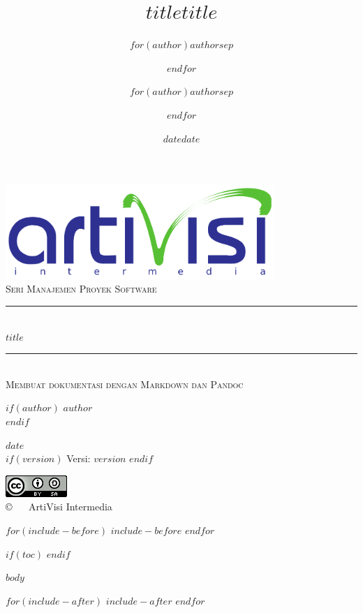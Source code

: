 \documentclass[a4,11pt]{$documentclass$}
\title{$title$}
\author{$for(author)$$author$$sep$ \and $endfor$}
\date{$date$}
\title{$title$}
\author{$for(author)$$author$$sep$ \and $endfor$}
\date{$date$}
\newcommand{\HRule}{\rule{\linewidth}{0.5mm}}
\begin{document}
\begin{titlepage}


    \begin{center}


        \includegraphics[width=4in]{./logo}\\[3cm]    

        \textsc{\LARGE Seri Manajemen Proyek Software}\\[0.5cm]

        \HRule \\[0.4cm]
        { \huge \bfseries $title$}\\[0.4cm]

        \HRule \\[0.5cm]

        \textsc{\Large Membuat dokumentasi dengan Markdown dan Pandoc}\\[2cm]

        \begin{minipage}{0.8\textwidth}
            \begin{flushright} \large
                $if(author)$
                    \emph{$author$} \\
                $endif$
                
                \emph{$date$} \\
                
                $if(version)$
                    {Versi:} \textsc{$version$}
                $endif$
                
            \end{flushright}
        \end{minipage}

        \vfill

        \includegraphics{./cc-by-sa} \\
        {\large \copyright ~ \the\year ~ ArtiVisi Intermedia}
    \end{center}

\end{titlepage}

$for(include-before)$
    $include-before$
$endfor$

$if(toc)$
{
    \hypersetup{linkcolor=black}
    \tableofcontents
}
$endif$

\newpage
{}

$body$


$for(include-after)$
    $include-after$
$endfor$
\end{document}
